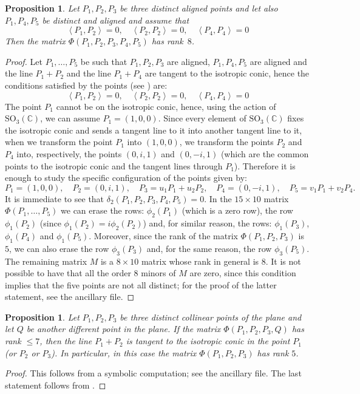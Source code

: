 \documentclass[12pt, a4paper, reqno, captions=tableheading,bibliography=totoc]{scrartcl}
\theoremstyle{plain}
\newtheorem{prop}[lemma]{Proposition}
\theoremstyle{definition}
\newcommand{\scl}[2]{\left\langle {#1}, {#2} \right\rangle}
\begin{document}
\begin{prop}
Let $P_1, P_2, P_3$ be three distinct aligned points and let also $P_1, P_4, P_5$
be distinct and aligned and assume that
\[
\scl{P_1}{P_2}=0, \quad \scl{P_2}{P_2}=0, \quad \scl{P_4}{P_4}=0
\]
Then the matrix $\Phi(P_1, P_2, P_3, P_4, P_5)$ has rank~$8$.
\label{prop:frecciaFissata}
\end{prop}
\begin{proof}
Let $P_1, \dots, P_5$ be such that $P_1, P_2, P_3$ are aligned,
$P_1, P_4, P_5$ are aligned and the line $P_1+P_2$ and the line
$P_1+P_4$ are tangent to the isotropic conic, hence
the conditions satisfied by the points (see ) are:
\[
\scl{P_1}{P_2}=0, \quad \scl{P_2}{P_2}=0, \quad \scl{P_4}{P_4}=0
\]
The point $P_1$ cannot be on the isotropic conic, hence, using the
action of $\mathrm{SO}_3(\mathbb{C})$, we can assume $P_1 = (1, 0, 0)$.
Since every element of $\mathrm{SO}_3(\mathbb{C})$ fixes the
isotropic conic and sends a tangent line to it into another
tangent line to it, when we transform the point $P_1$
into $(1, 0, 0)$, we transform the points $P_2$ and $P_4$ into, respectively,
the points $(0, i, 1)$ and $(0, -i, 1)$ (which are the common points to
the isotropic conic and the tangent lines through $P_1$).
Therefore it is enough to study the
specific configuration of the points given by:
\[
P_1 = (1, 0, 0), \quad P_2=(0, i, 1), \quad P_3=u_1P_1+u_2P_2, \quad
P_4= (0, -i, 1), \quad P_5 = v_1P_1+v_2P_4.
\]
It is immediate to see that $\delta_2(P_1, P_2, P_3, P_4, P_5) = 0$.
In the $15\times 10$ matrix $\Phi(P_1, \dots, P_5)$ we can erase the
rows: $\phi_2(P_1)$ (which is a zero row), the row $\phi_1(P_2)$
(since $\phi_1(P_2)=i\phi_2(P_2)$) and, for similar reason, the
rows: $\phi_1(P_3)$, $\phi_1(P_4)$ and $\phi_1(P_5)$.
Moreover, since the rank of the matrix $\Phi(P_1, P_2, P_3)$ is $5$,
we can also erase the row $\phi_3(P_3)$ and, for the same reason, the
row $\phi_3(P_5)$. The remaining matrix $M$ is a $8\times 10$ matrix whose rank
in general is $8$. It is not possible to have that all the order $8$ minors
of $M$ are zero, since this condition implies that the five points
are not all distinct; for the proof of the latter statement, see the ancillary file.
\end{proof}

\begin{prop}
\label{prop:condition3+1}
  Let $P_1, P_2, P_3$ be three distinct collinear points of the
  plane and let $Q$ be another different point in the plane.
  If the matrix $\Phi(P_1, P_2, P_3, Q)$ has rank $\leq 7$,
  then the line $P_1+P_2$ is tangent to the isotropic conic in the point
  $P_1$ (or $P_2$ or $P_3$).
  In particular, in this case the matrix $\Phi(P_1, P_2, P_3)$
  has rank $5$.
\end{prop}
\begin{proof}
 This follows from a symbolic computation; see the ancillary file.
 The last statement follows from .
\end{proof}
\end{document}
